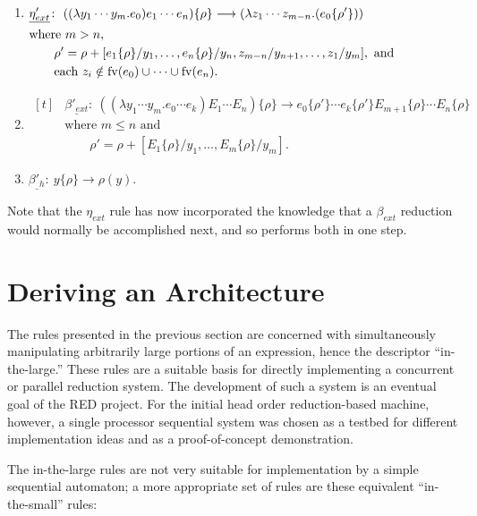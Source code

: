 \begin{enumerate}
\item \(\begin{aligned}[t]
&\underline{\eta'_{ext}}\colon\ ((\lambda y_1\cdots y_m.e_0)e_1\cdots e_n)\{\rho\}
\longrightarrow (\lambda z_1\cdots z_{m-n}.(e_0\{\rho'\}))\\
&\text{where }m>n,\\
&\qquad\rho'=\rho+[e_1\{\rho\}/y_1,\ldots,e_n\{\rho\}/y_n,
z_{m-n}/y_{n+1},\ldots,z_1/y_m],\text{ and}\\
&\qquad\text{each }z_i\notin\operatorname{fv}(e_0)\cup\cdots\cup\operatorname{fv}(e_n).
\end{aligned}\)

\item \(\begin{aligned}[t]
&\underline{\beta'_{ext}}\colon\ ((\lambda y_1\cdots y_m.e_0\cdots e_k)E_1\cdots E_n)\{\rho\}
\longrightarrow
 e_0\{\rho'\}\cdots e_k\{\rho'\}E_{m+1}\{\rho\}\cdots E_n\{\rho\}\\
&\text{where }m\le n\text{ and}\\
&\qquad\rho'=\rho+[E_1\{\rho\}/y_1,\ldots,E_m\{\rho\}/y_m].
\end{aligned}\)

\item \(\underline{\beta'_h}\colon\  y\{\rho\}\longrightarrow\rho(y)\).
\end{enumerate}

Note that the \(\eta_{ext}\) rule has now incorporated the knowledge that a
\(\beta_{ext}\) reduction would normally be accomplished next, and so performs
both in one step.

\section{Deriving an Architecture}

The rules presented in the previous section are concerned with simultaneously
manipulating arbitrarily large portions of an expression, hence the descriptor
``in-the-large.'' These rules are a suitable basis for directly implementing a
concurrent or parallel reduction system. The development of such a system is an
eventual goal of the RED project. For the initial head order reduction-based
machine, however, a single processor sequential system was chosen as a testbed
for different implementation ideas and as a proof-of-concept demonstration.

The in-the-large rules are not very suitable for implementation by a simple
sequential automaton; a more appropriate set of rules are these equivalent
``in-the-small'' rules:

